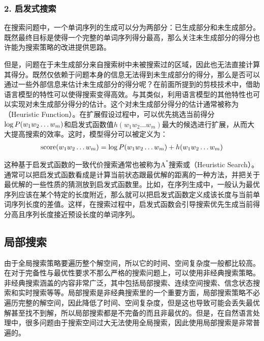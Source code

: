 \subsubsection{2. 启发式搜索}

\parinterval 在搜索问题中，一个单词序列的生成可以分为两部分：已生成部分和未生成部分。既然最终目标是使得一个完整的单词序列得分最高，那么关注未生成部分的得分也许能为搜索策略的改进提供思路。

\parinterval 但是，问题在于未生成部分来自搜索树中未被搜索过的区域，因此也无法直接计算其得分。既然仅依赖于问题本身的信息无法得到未生成部分的得分，那么是否可以通过一些外部信息来估计未生成部分的得分呢？在前面所提到的剪枝技术中，借助语言模型的特性可以使得搜索变得高效。与其类似，利用语言模型的其他特性也可以实现对未生成部分得分的估计。这个对未生成部分得分的估计通常被称为{\small{}}（Heuristic Function）。在扩展假设过程中，可以优先挑选当前得分$\log {P}(w_1 w_2 \ldots w_m)$和启发式函数值$h(w_1 w_2 \ldots w_m)$最大的候选进行扩展，从而大大提高搜索的效率。这时，模型得分可以被定义为：
\begin{eqnarray}
\textrm{score}(w_1 w_2 \ldots w_m) = \log {P}(w_1 w_2 \ldots w_m) + h(w_1 w_2 \ldots w_m)
\label{eq:2-45}
\end{eqnarray}

\parinterval 这种基于启发式函数的一致代价搜索通常也被称为$\textrm{A}^{\ast}$搜索或{\small{}}（Heuristic Search）。通常可以把启发式函数看成是计算当前状态跟最优解的距离的一种方法，并把关于最优解的一些性质的猜测放到启发式函数里。比如，在序列生成中，一般认为最优序列应该在某个特定的长度附近，那么就可以把启发式函数定义成该长度与当前单词序列长度的差值。这样，在搜索过程中，启发式函数会引导搜索优先生成当前得分高且序列长度接近预设长度的单词序列。


\subsection{局部搜索}

\parinterval 由于全局搜索策略要遍历整个解空间，所以它的时间、空间复杂度一般都比较高。在对于完备性与最优性要求不那么严格的搜索问题上，可以使用非经典搜索策略。非经典搜索涵盖的内容非常广泛，其中包括局部搜索、连续空间搜索、信念状态搜索和实时搜索等等。局部搜索是非经典搜索里的一个重要方面，局部搜索策略不必遍历完整的解空间，因此降低了时间、空间复杂度，但是这也导致可能会丢失最优解甚至找不到解，所以局部搜索都是不完备的而且非最优的。但是，在自然语言处理中，很多问题由于搜索空间过大无法使用全局搜索，因此使用局部搜索是非常普遍的。

